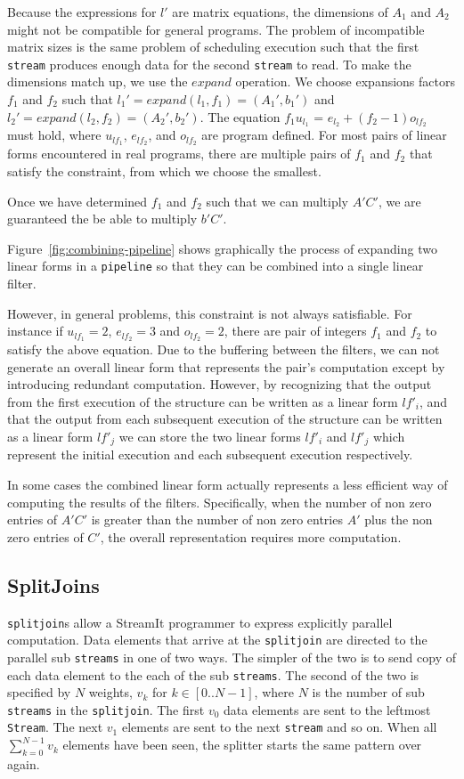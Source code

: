 Because the expressions for $l'$ are matrix equations, the dimensions of 
$A_1$ and $A_2$ might not be compatible for general programs.
The problem of incompatible matrix sizes is the same problem of scheduling execution 
such that the first {\tt stream} produces enough data for the second {\tt stream} 
to read. To make the dimensions match up, we use the $expand$ operation. We choose
expansions factors $f_1$ and $f_2$ such that $l_1' = expand(l_1,f_1) = (A_1',b_1')$ and 
$l_2' = expand(l_2,f_2) = (A_2',b_2')$. 
The equation $f_1u_{l_1}$ = $e_{l_2} + (f_2-1)o_{lf_2}$ must hold, where $u_{lf_1}$, $e_{lf_2}$, and $o_{lf_2}$
are program defined. For most pairs of linear forms encountered in real programs, 
there are multiple pairs of $f_1$ and $f_2$ that satisfy the constraint, from which
we choose the smallest.


Once we have determined $f_1$ and $f_2$ such 
that we can multiply $A'C'$, we are guaranteed the be able to multiply $b'C'$.

Figure~\ref{fig:combining-pipeline} shows graphically the process of expanding
two linear forms in a {\tt pipeline} so that they can be combined into a single linear filter.


However, in general problems, this constraint is not always satisfiable. For instance if
$u_{lf_1}=2$, $e_{lf_2}=3$ and $o_{lf_2}=2$, there are pair of integers $f_1$ and $f_2$ to 
satisfy the above equation. Due to the buffering between the filters, we can not generate an 
overall linear form that represents the pair's computation except by introducing redundant
computation. However, by recognizing that the output from the first execution of the structure
can be written as a linear form $lf'_i$, and that the output from each subsequent execution
of the structure can be written as a linear form $lf'_j$ we can store the two linear forms $lf'_i$ and
$lf'_j$ which represent the initial execution and each subsequent execution respectively.

In some cases the combined linear form
actually represents a less efficient way of computing the results of the
filters. Specifically, when the number of non zero entries of $A'C'$ is greater
than the number of non zero entries $A'$ plus the non zero entries of $C'$, the overall
representation requires more computation.


\subsection{SplitJoins}
{\tt splitjoin}s allow a StreamIt programmer to express explicitly parallel computation. 
Data elements that arrive at the {\tt splitjoin} are directed
to the parallel sub {\tt streams} in one of two ways.
The simpler of the two is to send copy of each data element to the each of the sub {\tt streams}. 
The second of the two is specified by $N$ weights, $v_k$ for $k\in[0..N-1]$, 
where $N$ is the number of sub {\tt streams} in the {\tt splitjoin}. The first $v_0$ data elements
are sent to the leftmost {\tt Stream}. The next $v_1$ elements are sent 
to the next {\tt stream} and so on. When all $\sum_{k=0}^{N-1} v_k$ elements
have been seen, the splitter starts the same pattern over again.

